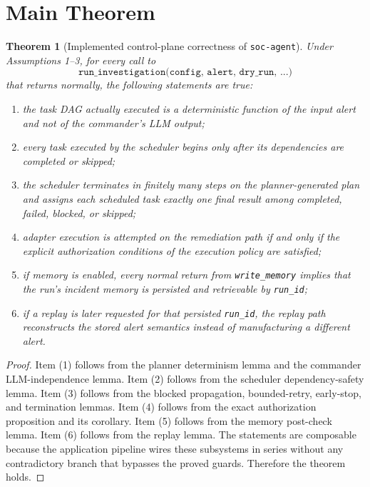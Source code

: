 \documentclass[11pt]{article}
\newtheorem{theorem}{Theorem}
\theoremstyle{definition}
\begin{document}
\section{Main Theorem}
\begin{theorem}[Implemented control-plane correctness of \texttt{soc-agent}]
Under Assumptions 1--3, for every call to
\[
\texttt{run\_investigation(config, alert, dry\_run, ...)}
\]
that returns normally, the following statements are true:
\begin{enumerate}[label=(\arabic*)]
\item the task DAG actually executed is a deterministic function of the input alert and not of
      the commander's LLM output;
\item every task executed by the scheduler begins only after its dependencies are completed or
      skipped;
\item the scheduler terminates in finitely many steps on the planner-generated plan and assigns
      each scheduled task exactly one final result among completed, failed, blocked, or skipped;
\item adapter execution is attempted on the remediation path if and only if the explicit
      authorization conditions of the execution policy are satisfied;
\item if memory is enabled, every normal return from \texttt{write\_memory} implies that the run's
      incident memory is persisted and retrievable by \texttt{run\_id};
\item if a replay is later requested for that persisted \texttt{run\_id}, the replay path
      reconstructs the stored alert semantics instead of manufacturing a different alert.
\end{enumerate}
\end{theorem}

\begin{proof}
Item (1) follows from the planner determinism lemma and the commander LLM-independence lemma.
Item (2) follows from the scheduler dependency-safety lemma. Item (3) follows from the blocked
propagation, bounded-retry, early-stop, and termination lemmas. Item (4) follows from the exact
authorization proposition and its corollary. Item (5) follows from the memory post-check lemma.
Item (6) follows from the replay lemma. The statements are composable because the application
pipeline wires these subsystems in series without any contradictory branch that bypasses the
proved guards. Therefore the theorem holds.
\end{proof}
\end{document}
